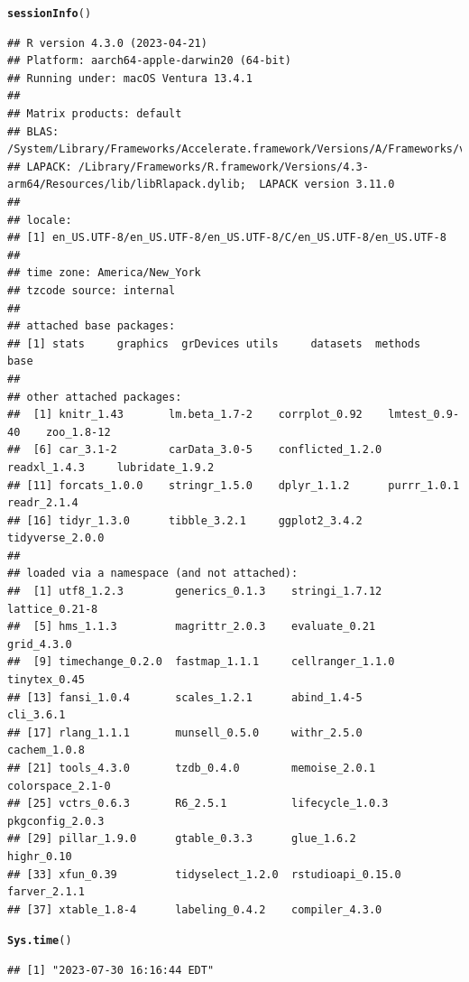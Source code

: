 \documentclass{article}\usepackage[]{graphicx}\usepackage[]{xcolor}
\makeatletter
\newcommand{\hlstd}[1]{\textcolor[rgb]{0.345,0.345,0.345}{#1}}%
\newcommand{\hlkwd}[1]{\textcolor[rgb]{0.737,0.353,0.396}{\textbf{#1}}}%
\newenvironment{kframe}{%
 \def\at@end@of@kframe{}%
 \ifinner\ifhmode%
  \def\at@end@of@kframe{\end{minipage}}%
  \begin{minipage}{\columnwidth}%
 \fi\fi%
 \def\FrameCommand##1{\hskip\@totalleftmargin \hskip-\fboxsep
 \colorbox{shadecolor}{##1}\hskip-\fboxsep
     \hskip-\linewidth \hskip-\@totalleftmargin \hskip\columnwidth}%
 \MakeFramed {\advance\hsize-\width
   \@totalleftmargin\z@ \linewidth\hsize
   \@setminipage}}%
 {\par\unskip\endMakeFramed%
 \at@end@of@kframe}
\newenvironment{knitrout}{}{} %
\makeatother
\begin{document}
\begin{knitrout}
\color{fgcolor}\begin{kframe}
\begin{alltt}
\hlkwd{sessionInfo}\hlstd{()}
\end{alltt}
\begin{verbatim}
## R version 4.3.0 (2023-04-21)
## Platform: aarch64-apple-darwin20 (64-bit)
## Running under: macOS Ventura 13.4.1
## 
## Matrix products: default
## BLAS:   /System/Library/Frameworks/Accelerate.framework/Versions/A/Frameworks/vecLib.framework/Versions/A/libBLAS.dylib 
## LAPACK: /Library/Frameworks/R.framework/Versions/4.3-arm64/Resources/lib/libRlapack.dylib;  LAPACK version 3.11.0
## 
## locale:
## [1] en_US.UTF-8/en_US.UTF-8/en_US.UTF-8/C/en_US.UTF-8/en_US.UTF-8
## 
## time zone: America/New_York
## tzcode source: internal
## 
## attached base packages:
## [1] stats     graphics  grDevices utils     datasets  methods   base     
## 
## other attached packages:
##  [1] knitr_1.43       lm.beta_1.7-2    corrplot_0.92    lmtest_0.9-40    zoo_1.8-12      
##  [6] car_3.1-2        carData_3.0-5    conflicted_1.2.0 readxl_1.4.3     lubridate_1.9.2 
## [11] forcats_1.0.0    stringr_1.5.0    dplyr_1.1.2      purrr_1.0.1      readr_2.1.4     
## [16] tidyr_1.3.0      tibble_3.2.1     ggplot2_3.4.2    tidyverse_2.0.0 
## 
## loaded via a namespace (and not attached):
##  [1] utf8_1.2.3        generics_0.1.3    stringi_1.7.12    lattice_0.21-8   
##  [5] hms_1.1.3         magrittr_2.0.3    evaluate_0.21     grid_4.3.0       
##  [9] timechange_0.2.0  fastmap_1.1.1     cellranger_1.1.0  tinytex_0.45     
## [13] fansi_1.0.4       scales_1.2.1      abind_1.4-5       cli_3.6.1        
## [17] rlang_1.1.1       munsell_0.5.0     withr_2.5.0       cachem_1.0.8     
## [21] tools_4.3.0       tzdb_0.4.0        memoise_2.0.1     colorspace_2.1-0 
## [25] vctrs_0.6.3       R6_2.5.1          lifecycle_1.0.3   pkgconfig_2.0.3  
## [29] pillar_1.9.0      gtable_0.3.3      glue_1.6.2        highr_0.10       
## [33] xfun_0.39         tidyselect_1.2.0  rstudioapi_0.15.0 farver_2.1.1     
## [37] xtable_1.8-4      labeling_0.4.2    compiler_4.3.0
\end{verbatim}
\begin{alltt}
\hlkwd{Sys.time}\hlstd{()}
\end{alltt}
\begin{verbatim}
## [1] "2023-07-30 16:16:44 EDT"
\end{verbatim}
\end{kframe}
\end{knitrout}
\end{document}
